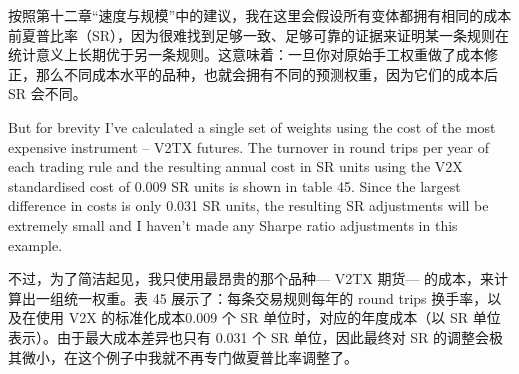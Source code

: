 \begin{chineseblock}按照第十二章“速度与规模”中的建议，我在这里会假设所有变体都拥有相同的成本前夏普比率（SR），因为很难找到足够一致、足够可靠的证据来证明某一条规则在统计意义上长期优于另一条规则。这意味着：一旦你对原始手工权重做了成本修正，那么不同成本水平的品种，也就会拥有不同的预测权重，因为它们的成本后 SR 会不同。\end{chineseblock}

\bipairgap

\begin{englishblock} But for brevity I've calculated a single set of weights using the cost of the most expensive instrument -- V2TX futures. The turnover in round trips per year of each trading rule and the resulting annual cost in SR units using the V2X standardised cost of 0.009 SR units is shown in table 45. Since the largest difference in costs is only 0.031 SR units, the resulting SR adjustments will be extremely small and I haven't made any Sharpe ratio adjustments in this example. \end{englishblock}

\begin{chineseblock}不过，为了简洁起见，我只使用最昂贵的那个品种--- V2TX 期货--- 的成本，来计算出一组统一权重。表 45 展示了：每条交易规则每年的 round trips 换手率，以及在使用 V2X 的标准化成本0.009 个 SR 单位时，对应的年度成本（以 SR 单位表示）。由于最大成本差异也只有 0.031 个 SR 单位，因此最终对 SR 的调整会极其微小，在这个例子中我就不再专门做夏普比率调整了。\end{chineseblock}

\begin{bilingualtableblock} 
\end{bilingualtableblock}

